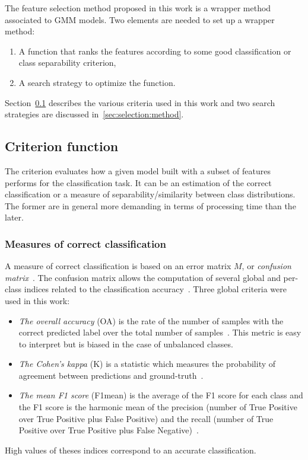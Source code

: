 \documentclass[journal,10pt]{IEEEtran}
\begin{document}
The feature selection method proposed in this work is a wrapper method associated to GMM models. Two elements are needed to set up a wrapper method:
\begin{enumerate}
\item A function that ranks the features according to some good classification or class separability criterion,
\item A search strategy to optimize the function.
\end{enumerate}

Section~\ref{sec:criterion} describes the various criteria used in this work and two search strategies are discussed in~\ref{sec:selection:method}.


    \subsection{Criterion function}
    \label{sec:criterion}
    The criterion evaluates how a given model built with a subset of features performs for the classification task. It can be an estimation of the correct classification or a measure of separability/similarity between class distributions. The former are in general more demanding in terms of processing time than the later.

        \subsubsection{Measures of correct classification}
        \label{sec:criterion-rate}

        A measure of correct classification is based on an error matrix $M$, or \emph{confusion matrix}~\cite[Chapter 4]{congalton2008assessing}. The confusion matrix allows the computation of several global and per-class indices related to the classification accuracy~\cite{congalton2008assessing}. Three global criteria were used in this work:

        \begin{itemize}
        \item  \emph{The overall  accuracy} (OA)  is the  rate of  the
          number of samples with the  correct predicted label over the
          total  number of  samples~\cite{congalton2008assessing}. This
          metric is  easy to interpret  but is  biased in the  case of
          unbalanced classes.

        \item \emph{The Cohen's kappa} (K) is a statistic which measures the probability of agreement between predictions and ground-truth~\cite{congalton2008assessing}.

        \item \emph{The mean F1 score}  (F1mean) is the average of the
          F1 score  for each class  and the  F1 score is  the harmonic
          mean of  the precision  (number of  True Positive  over True
          Positive plus False Positive) and the recall (number of True
          Positive over True Positive plus False Negative)~\cite{powers2011evaluation}.
        \end{itemize}
        High  values  of  theses  indices  correspond  to  an  accurate
        classification.
\end{document}
